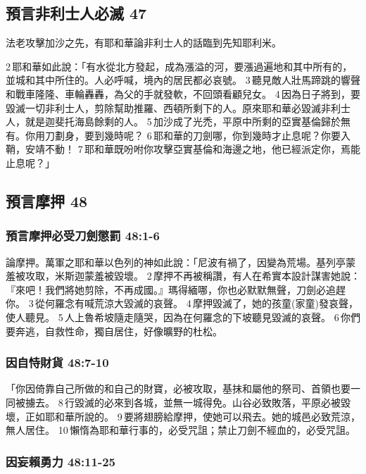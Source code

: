 \subsection{預言非利士人必滅 47}
法老攻擊加沙之先，有耶和華論非利士人的話臨到先知耶利米。

2 耶和華如此說：「有水從北方發起，成為漲溢的河，要漲過遍地和其中所有的，並城和其中所住的。人必呼喊，境內的居民都必哀號。 3 聽見敵人壯馬蹄跳的響聲和戰車隆隆、車輪轟轟，為父的手就發軟，不回頭看顧兒女。 4 因為日子將到，要毀滅一切非利士人，剪除幫助推羅、西頓所剩下的人。原來耶和華必毀滅非利士人，就是迦斐托海島餘剩的人。 5 加沙成了光禿，平原中所剩的亞實基倫歸於無有。你用刀劃身，要到幾時呢？ 6 耶和華的刀劍哪，你到幾時才止息呢？你要入鞘，安靖不動！ 7 耶和華既吩咐你攻擊亞實基倫和海邊之地，他已經派定你，焉能止息呢？」

\subsection{預言摩押 48}
\subsubsection{預言摩押必受刀劍懲罰 48:1-6}
論摩押。萬軍之耶和華以色列的神如此說：「尼波有禍了，因變為荒場。基列亭蒙羞被攻取，米斯迦蒙羞被毀壞。 2 摩押不再被稱讚，有人在希實本設計謀害她說：『來吧！我們將她剪除，不再成國。』瑪得緬哪，你也必默默無聲，刀劍必追趕你。 3 從何羅念有喊荒涼大毀滅的哀聲。 4 摩押毀滅了，她的孩童(家童)發哀聲，使人聽見。 5 人上魯希坡隨走隨哭，因為在何羅念的下坡聽見毀滅的哀聲。 6 你們要奔逃，自救性命，獨自居住，好像曠野的杜松。

\subsubsection{因自恃財貨 48:7-10}
「你因倚靠自己所做的和自己的財寶，必被攻取，基抹和屬他的祭司、首領也要一同被擄去。 8 行毀滅的必來到各城，並無一城得免。山谷必致敗落，平原必被毀壞，正如耶和華所說的。 9 要將翅膀給摩押，使她可以飛去。她的城邑必致荒涼，無人居住。 10 懶惰為耶和華行事的，必受咒詛；禁止刀劍不經血的，必受咒詛。

\subsubsection{因妄賴勇力 48:11-25}

